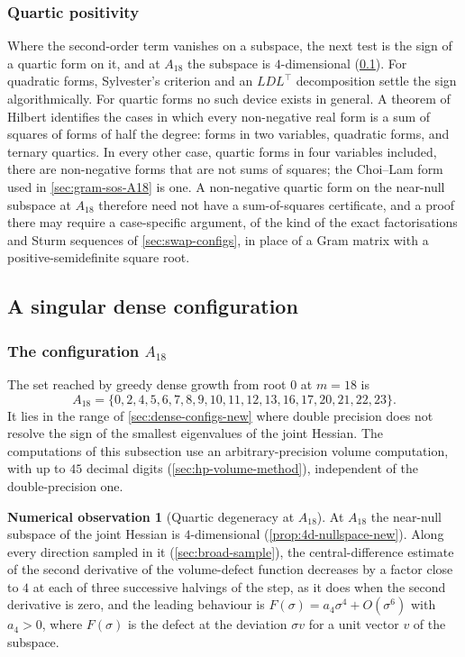 \documentclass[11pt,reqno]{amsart}
\renewcommand{\_}{\origunderscore\allowbreak}
\numberwithin{equation}{section}
\theoremstyle{plain}
\theoremstyle{definition}
\newtheorem{numobs}[thm]{Numerical observation}
\theoremstyle{remark}
\begin{document}
\subsubsection{Quartic positivity}\label{sec:quartic-hardness-new}

Where the second-order term vanishes on a subspace, the next test is
the sign of a quartic form on it, and at $A_{18}$ the subspace is
$4$-dimensional (\cref{sec:exact-sing}). For quadratic forms,
Sylvester's criterion and an $LDL^\top$ decomposition settle the sign
algorithmically. For quartic forms no such device exists in general. A
theorem of Hilbert \cite{Hil88} identifies the cases in which every
non-negative real form is a sum of squares of forms of half the degree:
forms in two variables, quadratic forms, and ternary quartics. In every
other case, quartic forms in four variables included, there are
non-negative forms that are not sums of squares; the Choi--Lam form
used in \cref{sec:gram-sos-A18} is one. A non-negative quartic form on
the near-null subspace at $A_{18}$ therefore need not have a
sum-of-squares certificate, and a proof there may require a
case-specific argument, of the kind of the exact factorisations and
Sturm sequences of \cref{sec:swap-configs}, in place of a Gram matrix
with a positive-semidefinite square root.

\subsection{A singular dense configuration}\label{sec:exact-sing}

\subsubsection{The configuration \texorpdfstring{$A_{18}$}{A18}}

The set reached by greedy dense growth from root $0$ at $m=18$ is
\[
  A_{18} = \{0,2,4,5,6,7,8,9,10,11,12,13,16,17,20,21,22,23\}.
\]
It lies in the range of \cref{sec:dense-configs-new} where double
precision does not resolve the sign of the smallest eigenvalues of the
joint Hessian. The computations of this subsection use an
arbitrary-precision volume computation, with up to $45$ decimal digits
(\cref{sec:hp-volume-method}), independent of the double-precision one.

\begin{numobs}[Quartic degeneracy at $A_{18}$]\label{thm:exact-sing-new}
At $A_{18}$ the near-null subspace of the joint Hessian is
$4$-dimensional (\cref{prop:4d-nullspace-new}). Along every direction
sampled in it (\cref{sec:broad-sample}), the central-difference
estimate of the second derivative of the volume-defect function
decreases by a factor close to $4$ at each of three successive halvings
of the step, as it does when the second derivative is zero, and the
leading behaviour is $F(\sigma)=a_4\sigma^4+O(\sigma^6)$ with $a_4>0$,
where $F(\sigma)$ is the defect at the deviation $\sigma v$ for a unit
vector $v$ of the subspace.
\end{numobs}
\end{document}
